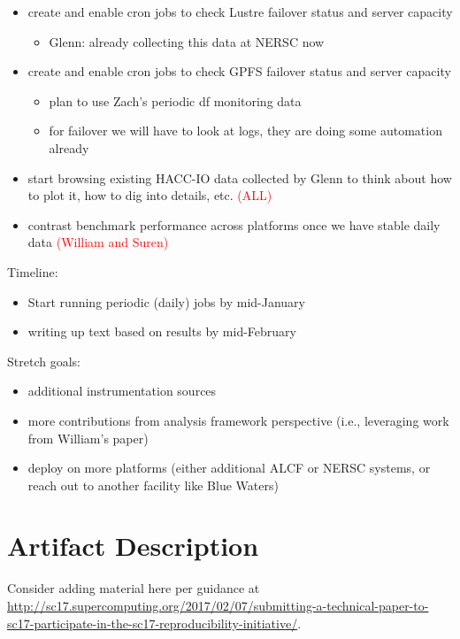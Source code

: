 \documentclass[conference,10pt,compsocconf]{IEEEtran}
\newcommand{\assign}[1]{\textcolor{red}{(#1)}}
\begin{document}
\begin{itemize}
\item create and enable cron jobs to check Lustre failover status and server
capacity
\begin{itemize}
\item Glenn: already collecting this data at NERSC now
\end{itemize}

\item create and enable cron jobs to check GPFS failover status and server
capacity
\begin{itemize}
\item plan to use Zach's periodic df monitoring data
\item for failover we will have to look at logs, they are doing some
automation already
\end{itemize}

\item start browsing existing HACC-IO data collected by Glenn to think about
how to plot it, how to dig into details, etc. \assign{ALL}
    
\item contrast benchmark performance across platforms once we have stable
daily data \assign{William and Suren}
\end{itemize}

Timeline:
\begin{itemize}
\item Start running periodic (daily) jobs by mid-January
\item writing up text based on results by mid-February
\end{itemize}

Stretch goals:
\begin{itemize}
\item additional instrumentation sources
\item more contributions from analysis framework perspective (i.e.,
leveraging work from William's paper) 
\item deploy on more platforms (either additional ALCF or NERSC systems, or
reach out to another facility like Blue Waters)
\end{itemize}





\appendix

\section{Artifact Description}

Consider adding material here per guidance at
\url{http://sc17.supercomputing.org/2017/02/07/submitting-a-technical-paper-to-sc17-participate-in-the-sc17-reproducibility-initiative/}.
\end{document}
